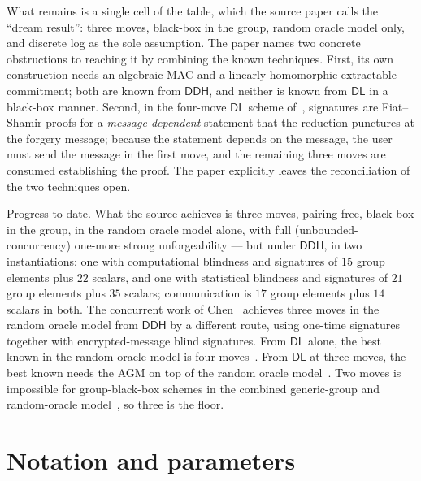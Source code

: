 \documentclass{conjura-conjecture}
\newcommand{\DL}{\mathsf{DL}}
\newcommand{\DDH}{\mathsf{DDH}}
\begin{document}
What remains is a single cell of the table, which the source paper calls
the ``dream result'': three moves, black-box in the group, random oracle
model only, and discrete log as the sole assumption. The paper names two
concrete obstructions to reaching it by combining the known techniques.
First, its own construction needs an algebraic MAC and a
linearly-homomorphic extractable commitment; both are known from $\DDH$,
and neither is known from $\DL$ in a black-box manner. Second, in the
four-move $\DL$ scheme of~\cite{KLR25}, signatures are Fiat--Shamir proofs
for a \emph{message-dependent} statement that the reduction punctures at
the forgery message; because the statement depends on the message, the
user must send the message in the first move, and the remaining three
moves are consumed establishing the proof. The paper explicitly leaves the
reconciliation of the two techniques open.

Progress to date. What the source achieves is three moves, pairing-free,
black-box in the group, in the random oracle model alone, with full
(unbounded-concurrency) one-more strong unforgeability --- but under
$\DDH$, in two instantiations: one with computational blindness and
signatures of $15$ group elements plus $22$ scalars, and one with
statistical blindness and signatures of $21$ group elements plus $35$
scalars; communication is $17$ group elements plus $14$ scalars in both.
The concurrent work of Chen~\cite{Che26} achieves three moves in the
random oracle model from $\DDH$ by a different route, using one-time
signatures together with encrypted-message blind signatures. From $\DL$
alone, the best known in the random oracle model is four
moves~\cite{KLR25}. From $\DL$ at three moves, the best known needs the
AGM on top of the random oracle model~\cite{Abe01,TZ22}. Two moves is
impossible for group-black-box schemes in the combined generic-group and
random-oracle model~\cite{DKT26}, so three is the floor.

\section{Notation and parameters}\label{sec:notation}
\end{document}
